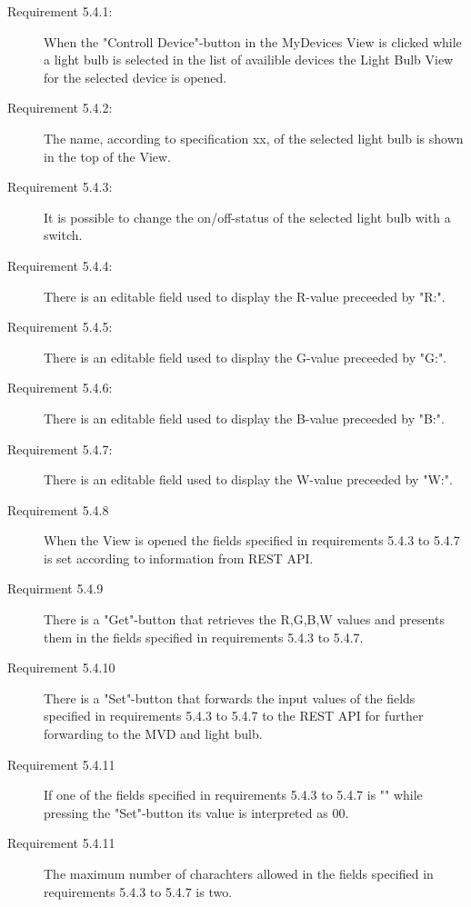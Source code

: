 \documentclass[a4paper]{article}
\begin{document}
\begin{description}
\item[Requirement 5.4.1:] When the "Controll Device"-button in the MyDevices View is clicked while a light bulb is selected in the list of availible devices the Light Bulb View for the selected device is opened. 

\item[Requirement 5.4.2:] The name, according to specification xx, of the selected light bulb is shown in the top of the View.

\item[Requirement 5.4.3:] It is possible to change the on/off-status of the selected light bulb with a switch.

\item[Requirement 5.4.4:] There is an editable field used to display the R-value preceeded by "R:".

\item[Requirement 5.4.5:] There is an editable field used to display the G-value preceeded by "G:".

\item[Requirement 5.4.6:] There is an editable field used to display the B-value preceeded by "B:".

\item[Requirement 5.4.7:] There is an editable field used to display the W-value preceeded by "W:".

\item[Requirement 5.4.8] When the View is opened the fields specified in requirements 5.4.3 to 5.4.7 is set according to information from REST API.

\item[Requirment 5.4.9] There is a "Get"-button that retrieves the R,G,B,W values and presents them in the fields specified in requirements 5.4.3 to 5.4.7.

\item[Requirement 5.4.10] There is a "Set"-button that forwards the input values of the fields specified in requirements 5.4.3 to 5.4.7 to the REST API for further forwarding to the MVD and light bulb.

\item[Requirement 5.4.11] If one of the fields specified in requirements 5.4.3 to 5.4.7 is "" while pressing the "Set"-button its value is interpreted as 00.

\item[Requirement 5.4.11] The maximum number of charachters allowed in the fields specified in requirements 5.4.3 to 5.4.7 is two.


\end{description}
\end{document}
